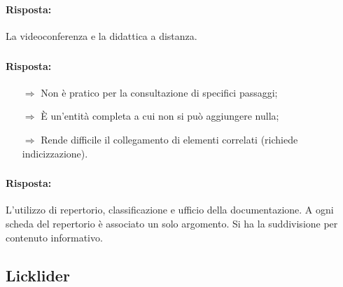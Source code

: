 \subsubsection{}


\paragraph{Risposta:} La videoconferenza e la didattica a distanza.

\subsubsection{}


\paragraph{Risposta:} 

\begin{itemize}
    \item [$\Rightarrow$] Non è pratico per la consultazione di specifici passaggi;
    \item [$\Rightarrow$] È un'entità completa a cui non si può aggiungere nulla;
    \item [$\Rightarrow$] Rende difficile il collegamento di elementi correlati (richiede indicizzazione).
\end{itemize}

\subsubsection{}


\paragraph{Risposta:} L'utilizzo di repertorio, classificazione e ufficio della documentazione.
A ogni scheda del repertorio è associato un solo argomento. Si ha la suddivisione per contenuto informativo.

\subsection{Licklider}

